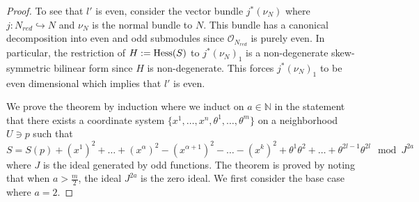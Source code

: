 \documentclass[11pt]{amsart}
\numberwithin{equation}{section}
\numberwithin{figure}{section}
\theoremstyle{plain}
\theoremstyle{definition}
\theoremstyle{remark}
\begin{document}
\begin{proof}
To see that $l'$ is even, consider the vector bundle $j^{*}(\nu_{N})$
where $j:N_{red}\hookrightarrow N$ and $\nu_{N}$ is the normal bundle
to $N$. This bundle has a canonical decomposition into even and odd
submodules since $\mathcal{O}_{N_{red}}$ is purely even. In particular,
the restriction of $H:=\mathrm{Hess}(S)$ to $j^{*}(\nu_{N})_{1}$ is a non-degenerate
skew-symmetric bilinear form since $H$ is non-degenerate. This forces
$j^{*}(\nu_{N})_{1}$ to be even dimensional which implies that $l'$
is even.

We prove the theorem by induction where we induct on $a\in\mathbb{N}$
in the statement that there exists a coordinate system $\{x^{1},\dots,x^{n},\theta^{1},\dots,\theta^{m}\}$
on a neighborhood $U\ni p$ such that 
\[
S=S(p)+\left(x^{1}\right)^{2}+\dots+\left(x^{\alpha}\right)^{2}-\left(x^{\alpha+1}\right)^{2}-\dots-\left(x^{k}\right)^{2}+\theta^{1}\theta^{2}+\dots+\theta^{2l-1}\theta^{2l}\mod J^{2a}
\]
where $J$ is the ideal generated by odd functions. The theorem is
proved by noting that when $a>\frac{m}{2}$, the ideal $J^{2a}$ is
the zero ideal. We first consider the base case where $a=2$.


\end{proof}
\end{document}
